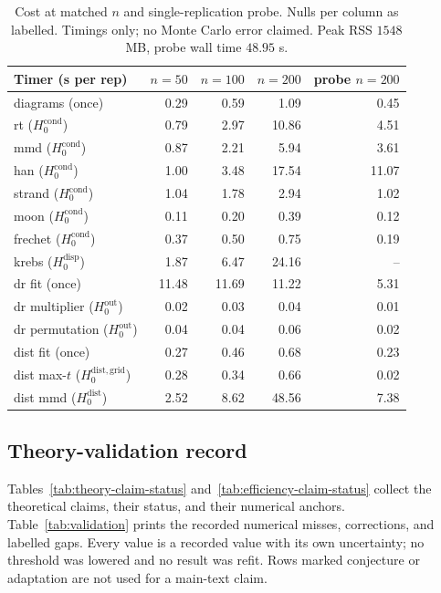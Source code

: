\begin{table}[t]
\centering
\small
\setlength{\tabcolsep}{4pt}
\begin{tabular}{@{}lrrrr@{}}
\hline
Timer (s per rep) & $n=50$ & $n=100$ & $n=200$ & probe $n=200$ \\
\hline
diagrams (once) & 0.29 & 0.59 & 1.09 & 0.45 \\
rt ($H_0^{\mathrm{cond}}$) & 0.79 & 2.97 & 10.86 & 4.51 \\
mmd ($H_0^{\mathrm{cond}}$) & 0.87 & 2.21 & 5.94 & 3.61 \\
han ($H_0^{\mathrm{cond}}$) & 1.00 & 3.48 & 17.54 & 11.07 \\
strand ($H_0^{\mathrm{cond}}$) & 1.04 & 1.78 & 2.94 & 1.02 \\
moon ($H_0^{\mathrm{cond}}$) & 0.11 & 0.20 & 0.39 & 0.12 \\
frechet ($H_0^{\mathrm{cond}}$) & 0.37 & 0.50 & 0.75 & 0.19 \\
krebs ($H_0^{\mathrm{disp}}$) & 1.87 & 6.47 & 24.16 & -- \\
dr fit (once) & 11.48 & 11.69 & 11.22 & 5.31 \\
dr multiplier ($H_0^{\mathrm{out}}$) & 0.02 & 0.03 & 0.04 & 0.01 \\
dr permutation ($H_0^{\mathrm{out}}$) & 0.04 & 0.04 & 0.06 & 0.02 \\
dist fit (once) & 0.27 & 0.46 & 0.68 & 0.23 \\
dist max-$t$ ($H_0^{\mathrm{dist,grid}}$) & 0.28 & 0.34 & 0.66 & 0.02 \\
dist mmd ($H_0^{\mathrm{dist}}$) & 2.52 & 8.62 & 48.56 & 7.38 \\
\hline
\end{tabular}
\caption{Cost at matched $n$ and single-replication probe. Nulls per column as labelled. Timings only; no Monte Carlo error claimed. Peak RSS $1548$ MB, probe wall time $48.95$ s.}
\label{tab:cost}
\end{table}

\subsection{Theory-validation record}
\label{app:validation-tab}

Tables~\ref{tab:theory-claim-status} and~\ref{tab:efficiency-claim-status} collect the theoretical claims, their status, and their numerical anchors. Table~\ref{tab:validation} prints the recorded numerical misses, corrections, and labelled gaps. Every value is a recorded value with its own uncertainty; no threshold was lowered and no result was refit. Rows marked conjecture or adaptation are not used for a main-text claim.


